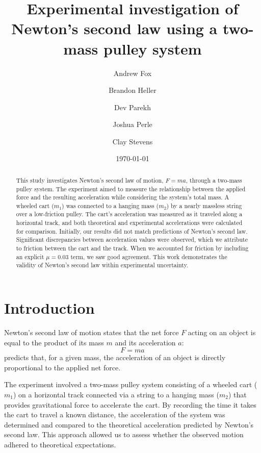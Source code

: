\documentclass[reprint,amsmath,amssymb,aps]{revtex4-2}
\begin{document}
\title{Experimental investigation of Newton's second law using a two-mass pulley system}
\author{Andrew Fox}
\author{Brandon Heller}
\author{Dev Parekh}
\author{Joshua Perle}
\author{Clay Stevens}
\date{\today}

\begin{abstract}
This study investigates Newton’s second law of motion, $F = ma$, through a two-mass pulley system. The experiment aimed to measure the relationship between the applied force and the resulting acceleration while considering the system's total mass. A wheeled cart ($m_1$) was connected to a hanging mass ($m_2$) by a nearly massless string over a low-friction pulley. The cart’s acceleration was measured as it traveled along a horizontal track, and both theoretical and experimental accelerations were calculated for comparison. Initially, our results did not match predictions of Newton's second law. Significant discrepancies between acceleration values were observed, which we attribute to friction between the cart and the track. When we accounted for friction by including an explicit $\mu=0.03$ term, we saw good agreement. This work demonstrates the validity of Newton’s second law within experimental uncertainty.
\end{abstract}


\maketitle






\section{Introduction}
Newton’s second law of motion states that the net force $F$ acting on an object is equal to the product of its mass $m$ and its acceleration $a$:
\begin{equation}
F = ma
\label{eq:1}
\end{equation}
 predicts that, for a given mass, the acceleration of an object is directly proportional to the applied net force. 

The experiment involved a two-mass pulley system consisting of a wheeled cart ($m_1$) on a horizontal track connected via a string to a hanging mass ($m_2$) that provides gravitational force to accelerate the cart. By recording the time it takes the cart to travel a known distance, the acceleration of the system was determined and compared to the theoretical acceleration predicted by Newton's second law. This approach allowed us to assess whether the observed motion adhered to theoretical expectations.
\end{document}
